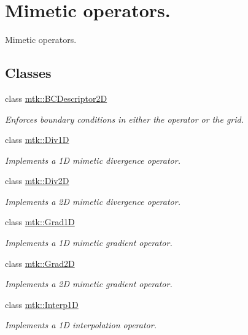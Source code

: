 \hypertarget{group__c07-mim__ops}{\section{Mimetic operators.}
\label{group__c07-mim__ops}
}


Mimetic operators.  


\subsection*{Classes}
\begin{DoxyCompactItemize}
\item 
class \hyperlink{classmtk_1_1BCDescriptor2D}{mtk\+::\+B\+C\+Descriptor2\+D}
\begin{DoxyCompactList}\small\item\em Enforces boundary conditions in either the operator or the grid. \end{DoxyCompactList}\item 
class \hyperlink{classmtk_1_1Div1D}{mtk\+::\+Div1\+D}
\begin{DoxyCompactList}\small\item\em Implements a 1\+D mimetic divergence operator. \end{DoxyCompactList}\item 
class \hyperlink{classmtk_1_1Div2D}{mtk\+::\+Div2\+D}
\begin{DoxyCompactList}\small\item\em Implements a 2\+D mimetic divergence operator. \end{DoxyCompactList}\item 
class \hyperlink{classmtk_1_1Grad1D}{mtk\+::\+Grad1\+D}
\begin{DoxyCompactList}\small\item\em Implements a 1\+D mimetic gradient operator. \end{DoxyCompactList}\item 
class \hyperlink{classmtk_1_1Grad2D}{mtk\+::\+Grad2\+D}
\begin{DoxyCompactList}\small\item\em Implements a 2\+D mimetic gradient operator. \end{DoxyCompactList}\item 
class \hyperlink{classmtk_1_1Interp1D}{mtk\+::\+Interp1\+D}
\begin{DoxyCompactList}\small\item\em Implements a 1\+D interpolation operator. \end{DoxyCompactList}\item 

\end{DoxyCompactItemize}
